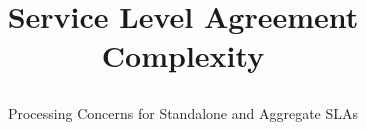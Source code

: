 \documentclass[a4paper,twoside]{article}
\begin{document}
\title{
Service Level Agreement Complexity  
\subtitle{Processing Concerns for Standalone and Aggregate SLAs}
}



\abstract{

}

\onecolumn \maketitle \normalsize \vfill





\end{document}
